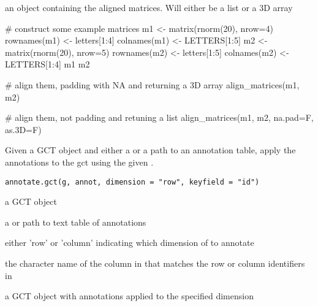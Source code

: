 \documentclass[letterpaper]{book}
\begin{document}
%
\begin{Value}
an object containing the aligned matrices. Will
either be a list or a 3D array
\end{Value}
%
\begin{Examples}
\begin{ExampleCode}
# construct some example matrices
m1 <- matrix(rnorm(20), nrow=4)
rownames(m1) <- letters[1:4]
colnames(m1) <- LETTERS[1:5]
m2 <- matrix(rnorm(20), nrow=5)
rownames(m2) <- letters[1:5]
colnames(m2) <- LETTERS[1:4]
m1
m2

# align them, padding with NA and returning a 3D array
align_matrices(m1, m2)

# align them, not padding and retuning a list
align_matrices(m1, m2, na.pad=F, as.3D=F)

\end{ExampleCode}
\end{Examples}
%
\begin{Description}\relax
Given a GCT object and either a  or
a path to an annotation table, apply the annotations to the
gct using the given .
\end{Description}
%
\begin{Usage}
\begin{verbatim}
annotate.gct(g, annot, dimension = "row", keyfield = "id")
\end{verbatim}
\end{Usage}
%
\begin{Arguments}
\begin{ldescription}
\item[\code{g}] a GCT object

\item[\code{annot}] a  or path to text table of annotations

\item[\code{dimension}] either 'row' or 'column' indicating which dimension
of  to annotate

\item[\code{keyfield}] the character name of the column in  that 
matches the row or column identifiers in 
\end{ldescription}
\end{Arguments}
%
\begin{Value}
a GCT object with annotations applied to the specified
dimension
\end{Value}
\end{document}
